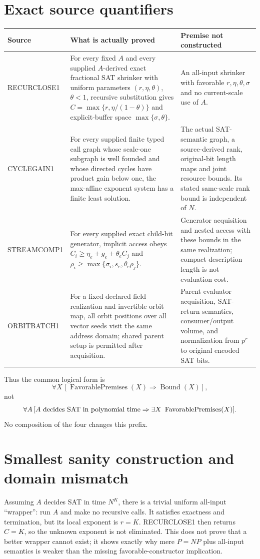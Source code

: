 \documentclass[11pt]{article}
\begin{document}
\section*{Exact source quantifiers}
\begin{center}\small
\begin{tabularx}{\textwidth}{p{}XX}
\toprule
Source & What is actually proved & Premise not constructed\\
\midrule
RECURCLOSE1 & For every fixed $A$ and every supplied $A$-derived exact
fractional SAT shrinker with uniform parameters $(r,\eta,\theta)$,
$\theta<1$, recursive substitution gives
$C=\max\{r,\eta/(1-\theta)\}$ and explicit-buffer space
$\max\{\sigma,\theta\}$. & An all-input shrinker with favorable $r,\eta,
\theta,\sigma$ and no current-scale use of $A$.\\
CYCLEGAIN1 & For every supplied finite typed call graph whose scale-one
subgraph is well founded and whose directed cycles have product gain below
one, the max-affine exponent system has a finite least solution. & The actual
SAT-semantic graph, a source-derived rank, original-bit length maps and joint
resource bounds.  Its stated same-scale rank bound is independent of $N$.\\
STREAMCOMP1 & For every supplied exact child-bit generator, implicit access
obeys $C_i\ge\eta_e+g_e+\theta_e C_j$ and
$\rho_i\ge\max\{\sigma_i,s_e,\theta_e\rho_j\}$. & Generator acquisition and
nested access with these bounds in the same realization; compact description
length is not evaluation cost.\\
ORBITBATCH1 & For a fixed declared field realization and invertible orbit map,
all orbit positions over all vector seeds visit the same address domain;
shared parent setup is permitted after acquisition. & Parent evaluator
acquisition, SAT-return semantics, consumer/output volume, and normalization
from $p^r$ to original encoded SAT bits.\\
\bottomrule
\end{tabularx}
\end{center}

Thus the common logical form is
\[
 \forall X\,[\operatorname{FavorablePremises}(X)\Rightarrow
 \operatorname{Bound}(X)],
\]
not
\[
 \forall A\,[A\hbox{ decides SAT in polynomial time}\Rightarrow
 \exists X\ \operatorname{FavorablePremises}(X)].
\]
No composition of the four changes this prefix.

\section*{Smallest sanity construction and domain mismatch}
Assuming $A$ decides SAT in time $N^K$, there is a trivial uniform all-input
``wrapper'': run $A$ and make no recursive calls.  It satisfies exactness and
termination, but its local exponent is $r=K$.  RECURCLOSE1 then returns
$C=K$, so the unknown exponent is not eliminated.  This does not prove that a
better wrapper cannot exist; it shows exactly why mere $P=NP$ plus all-input
semantics is weaker than the missing favorable-constructor implication.
\end{document}
